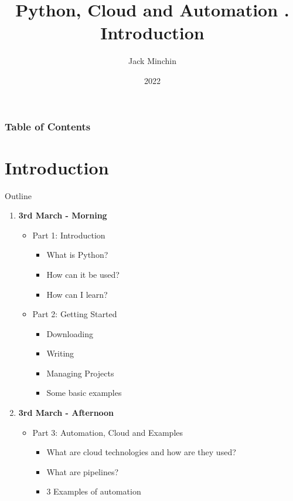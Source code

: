 \documentclass[aspectratio=169]{beamer}
\title{\large{\textbf{Python, Cloud and Automation}} \newline\newline 1. Introduction}
\author{Jack Minchin}
\institute{Tourism Economics}
\date{2022}
\begin{document}
\frame{\titlepage}

\begin{frame}
\frametitle{Table of Contents}
\tableofcontents
\end{frame}

\section{Introduction}

\begin{frame}{Outline}
	\begin{enumerate}
		\item \textbf{3rd March - Morning}
		\begin{itemize}
		\item Part 1: Introduction
			\begin{itemize}
			\item What is Python?
			\item How can it be used?
			\item How can I learn?
		\end{itemize}
		
		\item Part 2: Getting Started
		
		\begin{itemize}
  			\item Downloading
  			\item Writing
  			\item Managing Projects
  			\item Some basic examples
		\end{itemize}
		
		
		\end{itemize}
		
		\item \textbf{3rd March - Afternoon}
		
		\begin{itemize}
  		 	\item Part 3: Automation, Cloud and Examples
  		 	\begin{itemize}
			  \item What are cloud technologies and how are they used?
			  \item What are pipelines?
			  \item 3 Examples of automation
		\end{itemize}
		\end{itemize}

	

	\end{enumerate}
\end{frame}
\end{document}
